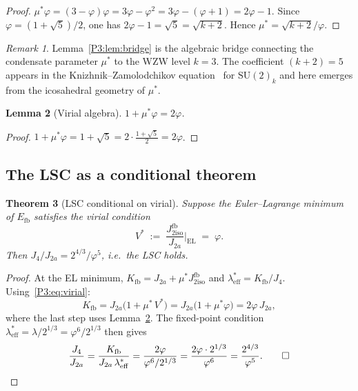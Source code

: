 \documentclass[11pt,a4paper]{article}
\newtheorem{theorem}{Theorem}[section]
\newtheorem{lemma}[theorem]{Lemma}
\theoremstyle{definition}
\theoremstyle{remark}
\newtheorem{remark}[theorem]{Remark}
\newcommand{\vp}{\varphi}
\newcommand{\lam}{\lambda}
\newcommand{\Kfb}{K_{\mathrm{fb}}}
\newcommand{\Jfb}{J_{2\mathrm{iso}}^{\mathrm{fb}}}
\newcommand{\Ja}{J_{2a}}
\newcommand{\Jfour}{J_{4}}
\newcommand{\leff}{\lambda_{\mathrm{eff}}}
\begin{document}
\begin{proof}
$\mu^*\vp = (3-\vp)\vp = 3\vp - \vp^2 = 3\vp - (\vp+1) = 2\vp-1$.
Since $\vp=(1+\sqrt{5})/2$, one has $2\vp-1=\sqrt{5}=\sqrt{k+2}$.
Hence $\mu^* = \sqrt{k+2}/\vp$.
\end{proof}

\begin{remark}
\label{P3:rem:bridge_interpretation}
Lemma~\ref{P3:lem:bridge} is the algebraic bridge connecting the
condensate parameter $\mu^*$ to the WZW level $k=3$.
The coefficient $(k+2)=5$ appears in the Knizhnik--Zamolodchikov
equation~\cite{KZ1984} for $\mathrm{SU}(2)_k$ and here emerges
from the icosahedral geometry of $\mu^*$.
\end{remark}

\begin{lemma}[Virial algebra]
\label{P3:lem:virial_alg}
$1 + \mu^*\vp = 2\vp$.
\end{lemma}

\begin{proof}
$1 + \mu^*\vp = 1 + \sqrt{5} = 2\cdot\frac{1+\sqrt{5}}{2} = 2\vp$.
\end{proof}

\subsection{The LSC as a conditional theorem}

\begin{theorem}[LSC conditional on virial]
\label{P3:thm:lsc_conditional}
Suppose the Euler--Lagrange minimum of $E_{\mathrm{fb}}$ satisfies
the virial condition
\begin{equation}
  V^* \;:=\; \frac{\Jfb}{\Ja}\bigg|_{\mathrm{EL}} \;=\; \vp.
  \label{P3:eq:virial}
\end{equation}
Then $\Jfour/\Ja = 2^{4/3}/\vp^5$, i.e.\ the LSC holds.
\end{theorem}

\begin{proof}
At the EL minimum, $\Kfb = \Ja + \mu^*\Jfb$ and
$\leff^* = \Kfb/\Jfour$.  Using~\eqref{P3:eq:virial}:
\begin{equation}
  \Kfb
  = \Ja\bigl(1 + \mu^*\,V^*\bigr)
  = \Ja\bigl(1 + \mu^*\vp\bigr)
  = 2\vp\,\Ja,
  \label{P3:eq:kfb_simplified}
\end{equation}
where the last step uses Lemma~\ref{P3:lem:virial_alg}.
The fixed-point condition $\leff^* = \lam/2^{1/3} = \vp^6/2^{1/3}$
then gives
\begin{equation}
  \frac{\Jfour}{\Ja}
  = \frac{\Kfb}{\Ja\,\leff^*}
  = \frac{2\vp}{\vp^6/2^{1/3}}
  = \frac{2\vp\cdot 2^{1/3}}{\vp^6}
  = \frac{2^{4/3}}{\vp^5}.
  \qed
\end{equation}
\end{proof}
\end{document}
